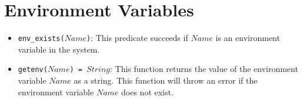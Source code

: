 \section{Environment Variables}
\begin{itemize}
\item \texttt{env\_exists($Name$)}: This predicate succeeds if $Name$ is an environment variable in the system.
\item \texttt{getenv($Name$) = $String$}: This function returns the value of the environment variable \texttt{$Name$} as a string. This function will throw an error if the environment variable $Name$ does not exist.
\end{itemize}
\ignore{

}
